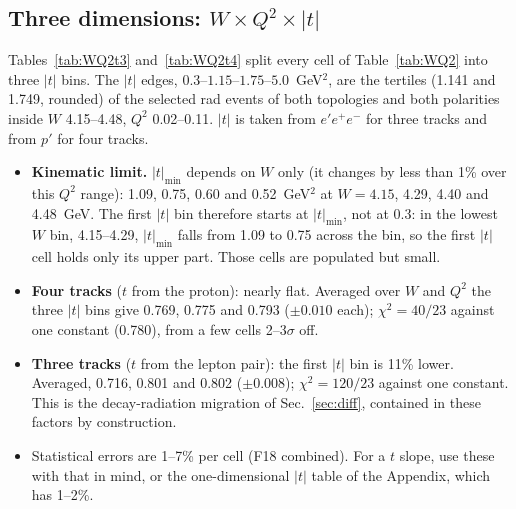 \documentclass[11pt]{article}
\newcommand{\crad}{C_{\rm rad}}
\begin{document}
\subsection{Three dimensions: $W\times Q^2\times|t|$}
Tables~\ref{tab:WQ2t3} and~\ref{tab:WQ2t4} split every cell of Table~\ref{tab:WQ2} into three $|t|$ bins. The $|t|$ edges,
$0.3$--$1.15$--$1.75$--$5.0$~GeV$^2$, are the tertiles (1.141 and 1.749, rounded) of the selected rad events of both
topologies and both polarities inside $W$ 4.15--4.48, $Q^2$ 0.02--0.11. $|t|$ is taken from $e'e^+e^-$ for three tracks and
from $p'$ for four tracks.
\begin{itemize}
\item \textbf{Kinematic limit.} $|t|_{\min}$ depends on $W$ only (it changes by less than 1\% over this $Q^2$ range):
1.09, 0.75, 0.60 and 0.52~GeV$^2$ at $W=4.15$, 4.29, 4.40 and 4.48~GeV. The first $|t|$ bin therefore starts at
$|t|_{\min}$, not at 0.3: in the lowest $W$ bin, 4.15--4.29, $|t|_{\min}$ falls from 1.09 to 0.75 across the bin, so
the first $|t|$ cell holds only its upper part. Those cells are populated but small.
\item \textbf{Four tracks} ($t$ from the proton): nearly flat. Averaged over $W$ and $Q^2$ the three $|t|$ bins give
0.769, 0.775 and 0.793 ($\pm0.010$ each); $\chi^2=40/23$ against one constant (0.780), from a few cells 2--3$\sigma$ off.
\item \textbf{Three tracks} ($t$ from the lepton pair): the first $|t|$ bin is 11\% lower. Averaged, 0.716, 0.801 and
0.802 ($\pm0.008$); $\chi^2=120/23$ against one constant. This is the decay-radiation migration of Sec.~\ref{sec:diff},
contained in these factors by construction.
\item Statistical errors are 1--7\% per cell (F18 combined). For a $t$ slope, use these with that in mind, or the
one-dimensional $|t|$ table of the Appendix, which has 1--2\%.
\end{itemize}
\begin{table}[H]\centering\footnotesize

\caption{$\crad(W,Q^2,|t|)$, $e'e^+e^-$: M.~Tenorio's $W$ and $Q^2$ bins, $|t|$ tertiles.}
\label{tab:WQ2t3}
\end{table}
\begin{table}[H]\centering\footnotesize

\caption{As Table~\ref{tab:WQ2t3}, $e'e^+e^-p'$.}
\label{tab:WQ2t4}
\end{table}

\end{document}
